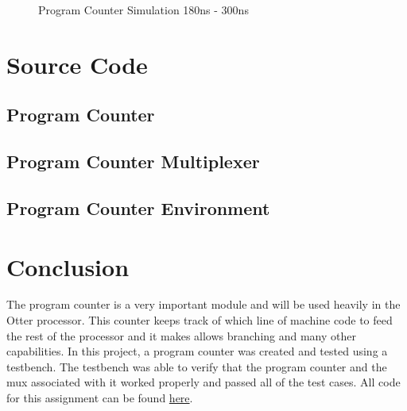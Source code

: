 \documentclass[
    a4paper, %
	12pt, %
    ]{CSSullivanBusinessReport}
\begin{document}
\begin{fullwidth}
\begin{figure}[H]
    \centering
    \captionsetup{style=widetable}
    \caption{Program Counter Simulation 180ns - 300ns}
    \label{fig:PCSimulation}
\end{figure}


\section{Source Code}
\captionsetup{style=widetable}
\subsection{Program Counter} %



\subsection{Program Counter Multiplexer} %



\subsection{Program Counter Environment} %





\section {Conclusion} %
\hypersetup{urlcolor=blue} 
The program counter is a very important module and will be used heavily in the Otter processor. This counter keeps track of which line of machine code to feed the rest of the processor and it makes allows branching and many other capabilities. In this project, a program counter was created and tested using a testbench. The testbench was able to verify that the program counter and the mux associated with it worked properly and passed all of the test cases.
All code for this assignment can be found \href{https://github.com/EthanV1920/CPE-233-Otter/tree/main}{here}.



\end{fullwidth}
\end{document}
